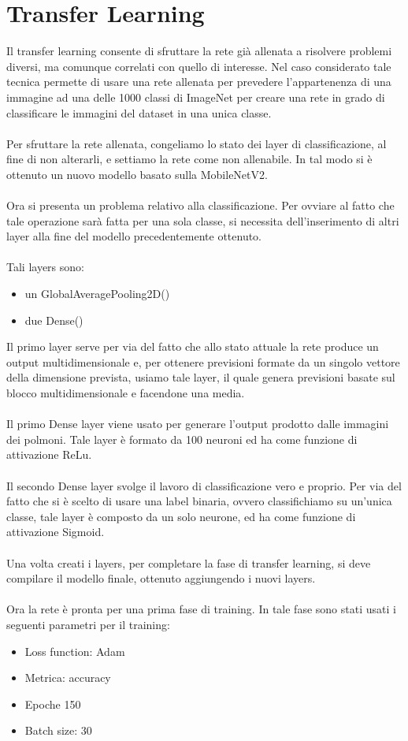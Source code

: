 \section{Transfer Learning}

Il transfer learning consente di sfruttare la rete già allenata a risolvere problemi diversi, ma comunque correlati con quello di interesse.
Nel caso considerato tale tecnica permette di usare una rete allenata per prevedere l'appartenenza di una immagine ad una delle 1000 classi di ImageNet
per creare una rete in grado di classificare le immagini del dataset in una unica classe.
\\\\
Per sfruttare la rete allenata, congeliamo lo stato dei layer di classificazione, al fine di non alterarli, e settiamo la rete come non allenabile.
In tal modo si è ottenuto un nuovo modello basato sulla MobileNetV2.
\\\\
Ora si presenta un problema relativo alla classificazione. Per ovviare al fatto che tale operazione sarà fatta per una sola classe, si necessita dell'inserimento di altri layer alla fine del modello precedentemente ottenuto.
\\\\
Tali layers sono:
\begin{itemize}
    \item un GlobalAveragePooling2D()
    \item due Dense() 
\end{itemize}  
Il primo layer serve per via del fatto che allo stato attuale la rete produce un output multidimensionale e, per ottenere previsioni formate da un singolo vettore 
della dimensione prevista, usiamo tale layer, il quale genera previsioni basate sul blocco multidimensionale e facendone una media.
\\\\
Il primo Dense layer viene usato per generare l'output prodotto dalle immagini dei polmoni. Tale layer è formato da 100 neuroni ed ha come funzione di attivazione ReLu.
\\\\
Il secondo Dense layer svolge il lavoro di classificazione vero e proprio. Per via del fatto che si è scelto di usare una label binaria, ovvero classifichiamo su un'unica classe, tale 
layer è composto da un solo neurone, ed ha come funzione di attivazione Sigmoid.
\\\\
Una volta creati i layers, per completare la fase di transfer learning, si deve compilare il modello finale, ottenuto aggiungendo i nuovi layers.
\\\\
Ora la rete è pronta per una prima fase di training. In tale fase sono stati usati i seguenti parametri per il training:
\begin{itemize}
    \item Loss function: Adam
    \item Metrica: accuracy
    \item Epoche 150
    \item Batch size: 30
\end{itemize}
